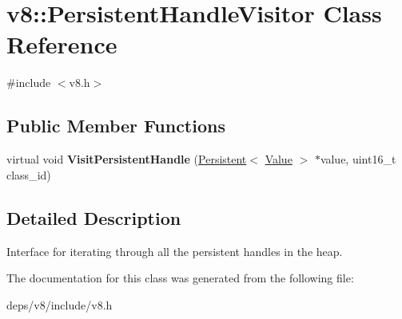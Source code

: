 \hypertarget{classv8_1_1_persistent_handle_visitor}{}\section{v8\+:\+:Persistent\+Handle\+Visitor Class Reference}
\label{classv8_1_1_persistent_handle_visitor}


{\ttfamily \#include $<$v8.\+h$>$}

\subsection*{Public Member Functions}
\begin{DoxyCompactItemize}
\item 
\hypertarget{classv8_1_1_persistent_handle_visitor_a092c6cc7700b38d9c60bd693a071045a}{}virtual void {\bfseries Visit\+Persistent\+Handle} (\hyperlink{classv8_1_1_persistent}{Persistent}$<$ \hyperlink{classv8_1_1_value}{Value} $>$ $\ast$value, uint16\+\_\+t class\+\_\+id)\label{classv8_1_1_persistent_handle_visitor_a092c6cc7700b38d9c60bd693a071045a}

\end{DoxyCompactItemize}


\subsection{Detailed Description}
Interface for iterating through all the persistent handles in the heap. 

The documentation for this class was generated from the following file\+:\begin{DoxyCompactItemize}
\item 
deps/v8/include/v8.\+h\end{DoxyCompactItemize}
